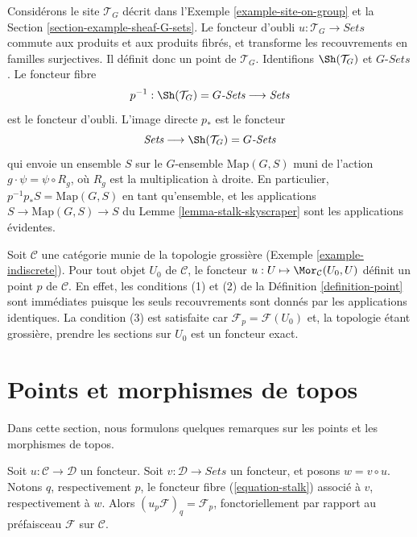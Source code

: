 \begin{example}
\label{example-point-G-sets}
Considérons le site $\mathcal{T}_G$ décrit dans
l’Exemple \ref{example-site-on-group} et la
Section \ref{section-example-sheaf-G-sets}.
Le foncteur d’oubli $u : \mathcal{T}_G \to \textit{Sets}$
commute aux produits et aux produits fibrés, et transforme
les recouvrements en familles surjectives. Il définit donc un point
de $\mathcal{T}_G$. Identifions $\Sh(\mathcal{T}_G)$
et $G\textit{-Sets}$. Le foncteur fibre
$$
p^{-1} :
\Sh(\mathcal{T}_G) = G\textit{-Sets}
\longrightarrow
\textit{Sets}
$$
est le foncteur d’oubli. L’image directe $p_*$ est le
foncteur
$$
\textit{Sets}
\longrightarrow
\Sh(\mathcal{T}_G) = G\textit{-Sets}
$$
qui envoie un ensemble $S$ sur le $G$-ensemble $\text{Map}(G, S)$ muni de
l’action $g \cdot \psi = \psi \circ R_g$, où $R_g$ est la multiplication
à droite. En particulier,
$p^{-1}p_*S = \text{Map}(G, S)$ en tant qu’ensemble, et les applications
$S \to \text{Map}(G, S) \to S$ du
Lemme \ref{lemma-stalk-skyscraper}
sont les applications évidentes.
\end{example}

\begin{example}
\label{example-indiscrete-points}
Soit $\mathcal{C}$ une catégorie munie de la topologie grossière
(Exemple \ref{example-indiscrete}). Pour tout objet $U_0$ de $\mathcal{C}$,
le foncteur $u : U \mapsto \Mor_\mathcal{C}(U_0, U)$ définit un point
$p$ de $\mathcal{C}$. En effet, les conditions (1) et (2) de la
Définition \ref{definition-point} sont immédiates puisque les seuls recouvrements
sont donnés par les applications identiques. La condition (3) est satisfaite car
$\mathcal{F}_p = \mathcal{F}(U_0)$ et, la topologie étant grossière,
prendre les sections sur $U_0$ est un foncteur exact.
\end{example}





\section{Points et morphismes de topos}
\label{section-functorial-points}

\noindent
Dans cette section, nous formulons quelques remarques sur les points et les morphismes
de topos.

\begin{lemma}
\label{lemma-point-functor}
Soit $u : \mathcal{C} \to \mathcal{D}$ un foncteur. Soit
$v : \mathcal{D} \to \textit{Sets}$ un foncteur, et posons
$w = v \circ u$. Notons $q$, respectivement $p$, le foncteur fibre
(\ref{equation-stalk}) associé à $v$, respectivement à $w$.
Alors $(u_p\mathcal{F})_q = \mathcal{F}_p$, fonctoriellement par rapport au
préfaisceau $\mathcal{F}$ sur $\mathcal{C}$.
\end{lemma}

